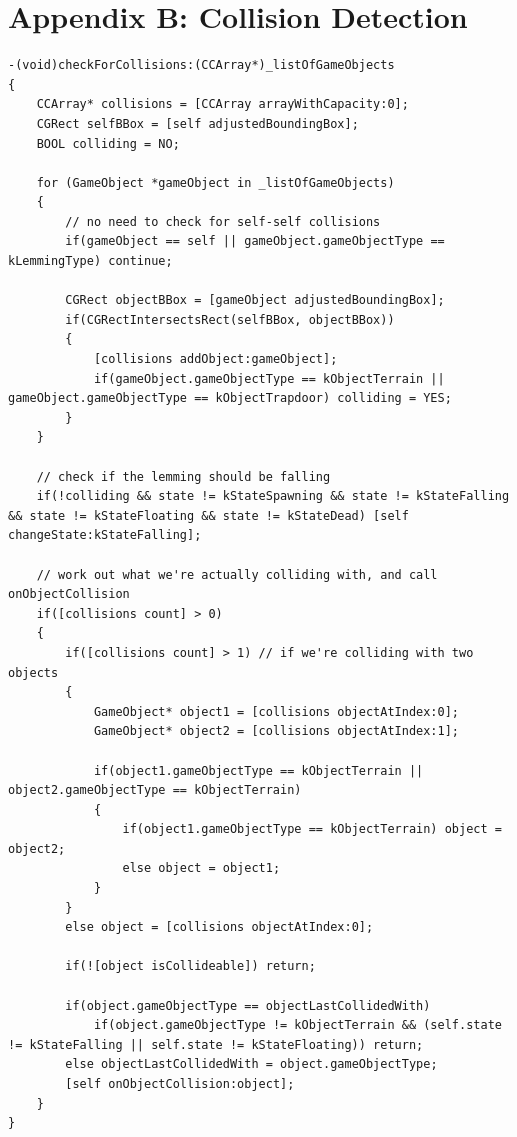\documentclass[a4paper,oneside]{report}
\begin{document}
\section{Appendix B: Collision Detection}
\begin{lstlisting}
-(void)checkForCollisions:(CCArray*)_listOfGameObjects
{
    CCArray* collisions = [CCArray arrayWithCapacity:0];
    CGRect selfBBox = [self adjustedBoundingBox];
    BOOL colliding = NO;
    
    for (GameObject *gameObject in _listOfGameObjects) 
    {
        // no need to check for self-self collisions
        if(gameObject == self || gameObject.gameObjectType == kLemmingType) continue;
        
        CGRect objectBBox = [gameObject adjustedBoundingBox];
        if(CGRectIntersectsRect(selfBBox, objectBBox)) 
        {
            [collisions addObject:gameObject];
            if(gameObject.gameObjectType == kObjectTerrain || gameObject.gameObjectType == kObjectTrapdoor) colliding = YES;
        }
    }
    
    // check if the lemming should be falling
    if(!colliding && state != kStateSpawning && state != kStateFalling && state != kStateFloating && state != kStateDead) [self changeState:kStateFalling];
    
    // work out what we're actually colliding with, and call onObjectCollision
    if([collisions count] > 0)
    {
        if([collisions count] > 1) // if we're colliding with two objects
        {        
            GameObject* object1 = [collisions objectAtIndex:0];
            GameObject* object2 = [collisions objectAtIndex:1];
            
            if(object1.gameObjectType == kObjectTerrain || object2.gameObjectType == kObjectTerrain) 
            {
                if(object1.gameObjectType == kObjectTerrain) object = object2;
                else object = object1;
            }
        }
        else object = [collisions objectAtIndex:0];
        
        if(![object isCollideable]) return;

        if(object.gameObjectType == objectLastCollidedWith) 
            if(object.gameObjectType != kObjectTerrain && (self.state != kStateFalling || self.state != kStateFloating)) return;
        else objectLastCollidedWith = object.gameObjectType; 
        [self onObjectCollision:object];
    }
}
\end{lstlisting}
\newpage
\end{document}
